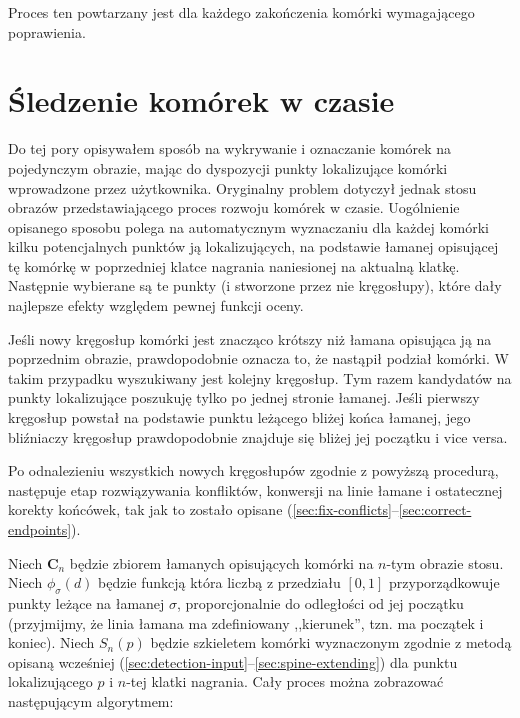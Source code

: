 \documentclass[declaration,shortabstract,mgr]{iithesis}
\begin{document}
Proces ten powtarzany jest dla każdego zakończenia komórki wymagającego poprawienia.

\section{Śledzenie komórek w czasie}
\label{sec:cell-tracking}

Do tej pory opisywałem sposób na wykrywanie i oznaczanie komórek na pojedynczym obrazie, mając do dyspozycji punkty lokalizujące komórki wprowadzone przez użytkownika.
Oryginalny problem dotyczył jednak stosu obrazów przedstawiającego proces rozwoju komórek w czasie.
Uogólnienie opisanego sposobu polega na automatycznym wyznaczaniu dla każdej komórki kilku potencjalnych punktów ją lokalizujących, na podstawie łamanej opisującej tę komórkę w poprzedniej klatce nagrania naniesionej na aktualną klatkę.
Następnie wybierane są te punkty (i stworzone przez nie kręgosłupy), które dały najlepsze efekty względem pewnej funkcji oceny.

Jeśli nowy kręgosłup komórki jest znacząco krótszy niż łamana opisująca ją na poprzednim obrazie, prawdopodobnie oznacza to, że nastąpił podział komórki. W takim przypadku wyszukiwany jest kolejny kręgosłup. Tym razem kandydatów na punkty lokalizujące poszukuję tylko po jednej stronie łamanej. Jeśli pierwszy kręgosłup powstał na podstawie punktu leżącego bliżej końca łamanej, jego bliźniaczy kręgosłup prawdopodobnie znajduje się bliżej jej początku i vice versa.

Po odnalezieniu wszystkich nowych kręgosłupów zgodnie z powyższą procedurą, następuje etap rozwiązywania konfliktów, konwersji na linie łamane i ostatecznej korekty końcówek, tak jak to zostało opisane (\ref{sec:fix-conflicts}--\ref{sec:correct-endpoints}).



Niech $\mathbf{C}_n$ będzie zbiorem łamanych opisujących komórki na $n$-tym obrazie stosu.
Niech $\phi_\sigma(d)$ będzie funkcją która liczbą z przedziału $[0, 1]$ przyporządkowuje punkty leżące na łamanej $\sigma$, proporcjonalnie do odległości od jej początku (przyjmijmy, że linia łamana ma zdefiniowany ,,kierunek'', tzn. ma początek i koniec). Niech $S_n(p)$ będzie szkieletem komórki wyznaczonym zgodnie z metodą opisaną wcześniej (\ref{sec:detection-input}--\ref{sec:spine-extending}) dla punktu lokalizującego $p$ i $n$-tej klatki nagrania.
Cały proces można zobrazować następującym algorytmem:
\end{document}
